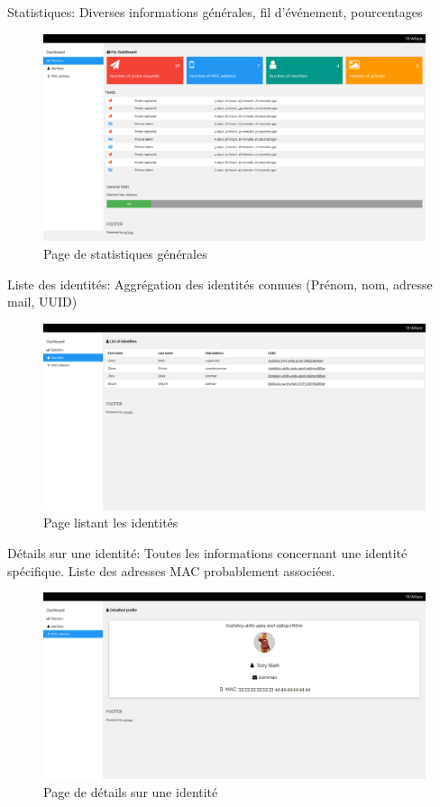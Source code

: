 Statistiques: Diverses informations générales, fil d'événement, pourcentages
\begin{figure}[H]
	\centering
	\includegraphics[width=16cm]{images/dashboard/stats.png}
	\caption{Page de statistiques générales}
	\label{fig:dashboard_stats}
\end{figure}

Liste des identités: Aggrégation des identités connues (Prénom, nom, adresse mail, UUID)
\begin{figure}[H]
	\centering
	\includegraphics[width=16cm]{images/dashboard/list-identities.png}
	\caption{Page listant les identités}
	\label{fig:dashboard_list_identities}
\end{figure}

Détails sur une identité: Toutes les informations concernant une identité spécifique. Liste des adresses MAC probablement associées. 
\begin{figure}[H]
	\centering
	\includegraphics[width=16cm]{images/dashboard/identity.png}
	\caption{Page de détails sur une identité}
	\label{fig:dashboard_stats}
\end{figure}

